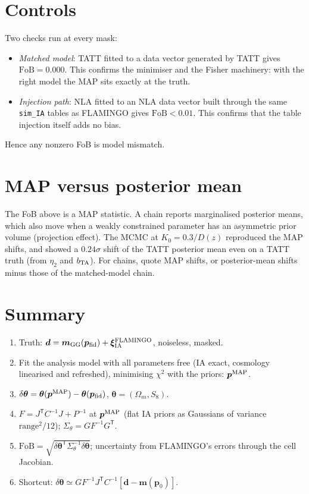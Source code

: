 \documentclass[11pt]{article}
\newcommand{\vd}{\bm{d}}
\newcommand{\vm}{\bm{m}}
\newcommand{\vp}{\bm{p}}
\newcommand{\vth}{\bm{\theta}}
\newcommand{\tp}{^{\mathsf T}}
\newcommand{\fob}{\mathrm{FoB}}
\begin{document}
\section{Controls}
Two checks run at every mask:
\begin{itemize}[itemsep=1pt]
\item \emph{Matched model}: TATT fitted to a data vector generated by TATT
  gives $\fob = 0.000$. This confirms the minimiser and the Fisher
  machinery: with the right model the MAP sits exactly at the truth.
\item \emph{Injection path}: NLA fitted to an NLA data vector built through
  the same \texttt{sim\_IA} tables as FLAMINGO gives $\fob < 0.01$. This
  confirms that the table injection itself adds no bias.
\end{itemize}
Hence any nonzero FoB is model mismatch.

\section{MAP versus posterior mean}
The FoB above is a MAP statistic. A chain reports marginalised posterior
means, which also move when a weakly constrained parameter has an asymmetric
prior volume (projection effect). The MCMC at $K_0 = 0.3/D(z)$ reproduced the
MAP shifts, and showed a $0.24\sigma$ shift of the TATT posterior mean even
on a TATT truth (from $\eta_2$ and $b_{\rm TA}$). For chains, quote MAP
shifts, or posterior-mean shifts minus those of the matched-model chain.

\section{Summary}\label{sec:summary}
\begin{enumerate}[itemsep=2pt]
\item Truth: $\vd = \vm_{\rm GG}(\vp_{\rm fid}) + \bm{\xi}_{\rm IA}^{\rm FLAMINGO}$, noiseless, masked.
\item Fit the analysis model with all parameters free (IA exact, cosmology
  linearised and refreshed), minimising $\chi^2$ with the priors:
  $\vp^{\rm MAP}$.
\item $\delta\vth = \vth(\vp^{\rm MAP}) - \vth(\vp_{\rm fid})$, $\vth = (\Omega_m, S_8)$.
\item $F = J\tp C^{-1}J + P^{-1}$ at $\vp^{\rm MAP}$ (flat IA priors as
  Gaussians of variance $\text{range}^2/12$); $\Sigma_\theta = G F^{-1} G\tp$.
\item $\fob = \sqrt{\delta\vth\tp\Sigma_\theta^{-1}\delta\vth}$; uncertainty
  from FLAMINGO's errors through the cell Jacobian.
\item Shortcut: $\delta\vth \simeq G F^{-1}J\tp C^{-1}[\vd - \vm(\vp_0)]$.
\end{enumerate}
\end{document}
